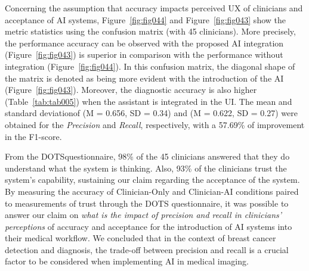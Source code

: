 Concerning the assumption that accuracy impacts perceived \ac{UX} of clinicians and acceptance of \ac{AI} systems, Figure~\ref{fig:fig044} and Figure~\ref{fig:fig043} show the metric statistics using the confusion matrix (with 45 clinicians).
More precisely, the performance accuracy can be observed with the proposed \ac{AI} integration (Figure~\ref{fig:fig043}) is superior in comparison with the performance without integration (Figure~\ref{fig:fig044}).
In this confusion matrix, the diagonal shape of the matrix is denoted as being more evident with the introduction of the \ac{AI} (Figure~\ref{fig:fig043}).
Moreover, the diagnostic accuracy is also higher (Table~\ref{tab:tab005}) when the assistant is integrated in the \ac{UI}.
The mean and standard deviation\footnotemark[24] of (M = 0.656, SD = 0.34) and 
(M = 0.622, SD = 0.27) were obtained for the {\it Precision} and {\it Recall}, respectively, with a 57.69\% of improvement in the F1-score.




From the \ac{DOTS}\footnotemark[25] questionnaire, 98\% of the 45 clinicians answered that they do understand what the system is thinking.
Also, 93\% of the clinicians trust the system's capability, sustaining our claim regarding the acceptance of the system.
By measuring the accuracy of Clinician-Only and Clinician-AI conditions paired to measurements of trust through the \ac{DOTS} questionnaire, it was possible to answer our claim on {\it what is the impact of precision and recall in clinicians' perceptions} of accuracy and acceptance for the introduction of \ac{AI} systems into their medical workflow.
We concluded that in the context of breast cancer detection and diagnosis, the trade-off between precision and recall is a crucial factor to be considered when implementing \ac{AI} in medical imaging.



